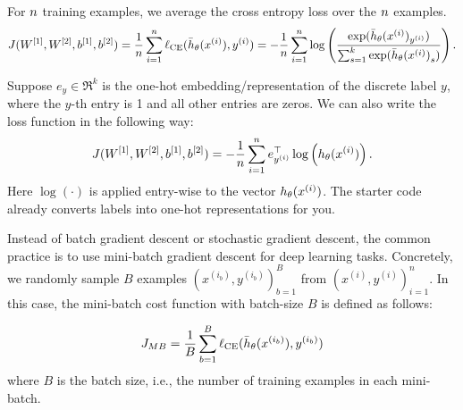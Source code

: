 For ${n}$ training examples, we average the cross entropy loss over the ${n}$ examples.
  \begin{equation*}
  J(W^{[1]},W^{[2]},b^{[1]},b^{[2]}) = \frac{1}{{n}}\sum_{i=1}^{n} \ell_\textup{CE}(\bar{h}_{\theta}(x^{(i)}),y^{(i)})  = - \frac{1}{{n}}\sum_{i=1}^{n} \log\left(\frac{\exp(\bar{h}_{\theta}(x^{(i)})_{y^{(i)}})}{\sum_{s=1}^{k}\exp({\bar{h}_{\theta}(x^{(i)})}_s)}\right).
  \end{equation*}

Suppose $e_y\in \Re^k$ is the one-hot embedding/representation of the discrete label $y$, where the $y$-th entry is 1 and all other entries are zeros. We can also write the loss function in the following way:
  \begin{equation*}
  J(W^{[1]},W^{[2]},b^{[1]},b^{[2]}) = - \frac{1}{{n}}\sum_{i=1}^{n} e_{y^{(i)}}^\top\log\left(h_\theta(x^{(i)})\right).
  \end{equation*}
Here $\log(\cdot)$ is applied entry-wise to the vector $h_\theta(x^{(i)})$. The starter code already converts labels into one-hot representations for you.


Instead of batch gradient descent or stochastic gradient descent, the common practice
is to use mini-batch gradient descent for deep learning tasks. Concretely, we randomly sample $B$ examples $(x^{(i_b)}, y^{(i_b)})_{b=1}^B$ from $(x^{(i)}, y^{(i)})_{i=1}^n$. In this case, the
mini-batch cost function with batch-size $B$ is defined as follows:

  \begin{equation*}
  J_{MB} = \frac{1}{B}\sum_{b=1}^B \ell_\textup{CE}(\bar{h}_{\theta}(x^{(i_b)}),y^{(i_b)})
  \end{equation*}
where $B$ is the batch size, i.e., the number of training examples in each mini-batch. %

\begin{enumerate}
  

\ifnum{} {
  
} \fi

  

\ifnum{} {
  
} \fi

  

\ifnum{} {
  
} \fi


  
\ifnum{} {
  
} \fi

 \end{enumerate}

